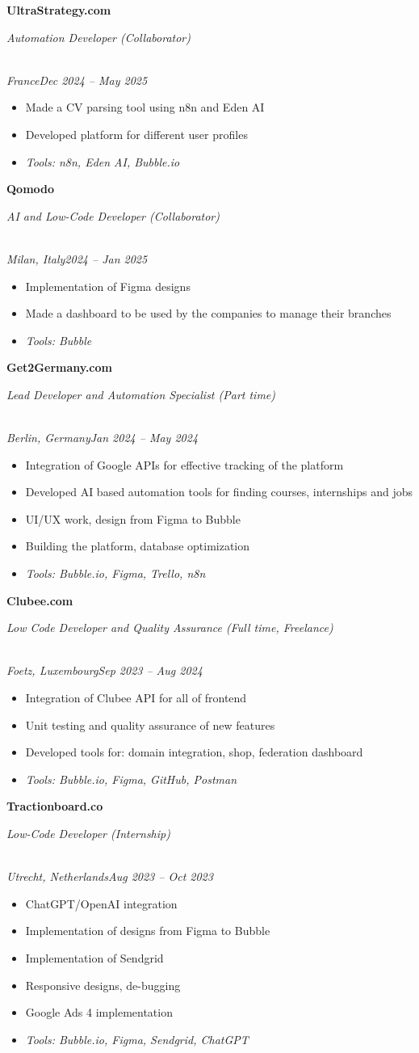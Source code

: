 \documentclass[a4paper,10pt]{article}
\newcommand{\role}[4]{\vspace{3pt}\noindent\hspace{0.6em}\parbox[t]{0.38\textwidth}{\raggedright\textbf{#1}}\hfill\parbox[t]{0.58\textwidth}{\raggedleft\textit{#2}}\\{\textit{#3}\hfill\textit{#4}}\vspace{1pt}}
\begin{document}
\role{UltraStrategy.com}{Automation Developer (Collaborator)}{France}{Dec 2024 -- May 2025}
\begin{itemize}
\item Made a CV parsing tool using n8n and Eden AI
\item Developed platform for different user profiles
\item \textit{Tools: n8n, Eden AI, Bubble.io}
\end{itemize}

\role{Qomodo}{AI and Low-Code Developer (Collaborator)}{Milan, Italy}{2024 -- Jan 2025}
\begin{itemize}
\item Implementation of Figma designs
\item Made a dashboard to be used by the companies to manage their branches
\item \textit{Tools: Bubble}
\end{itemize}

\role{Get2Germany.com}{Lead Developer and Automation Specialist (Part time)}{Berlin, Germany}{Jan 2024 -- May 2024}
\begin{itemize}
\item Integration of Google APIs for effective tracking of the platform
\item Developed AI based automation tools for finding courses, internships and jobs
\item UI/UX work, design from Figma to Bubble
\item Building the platform, database optimization
\item \textit{Tools: Bubble.io, Figma, Trello, n8n}
\end{itemize}

\role{Clubee.com}{Low Code Developer and Quality Assurance (Full time, Freelance)}{Foetz, Luxembourg}{Sep 2023 -- Aug 2024}
\begin{itemize}
\item Integration of Clubee API for all of frontend
\item Unit testing and quality assurance of new features
\item Developed tools for: domain integration, shop, federation dashboard
\item \textit{Tools: Bubble.io, Figma, GitHub, Postman}
\end{itemize}

\role{Tractionboard.co}{Low-Code Developer (Internship)}{Utrecht, Netherlands}{Aug 2023 -- Oct 2023}
\begin{itemize}
\item ChatGPT/OpenAI integration
\item Implementation of designs from Figma to Bubble
\item Implementation of Sendgrid
\item Responsive designs, de-bugging
\item Google Ads 4 implementation
\item \textit{Tools: Bubble.io, Figma, Sendgrid, ChatGPT}
\end{itemize}
\end{document}
